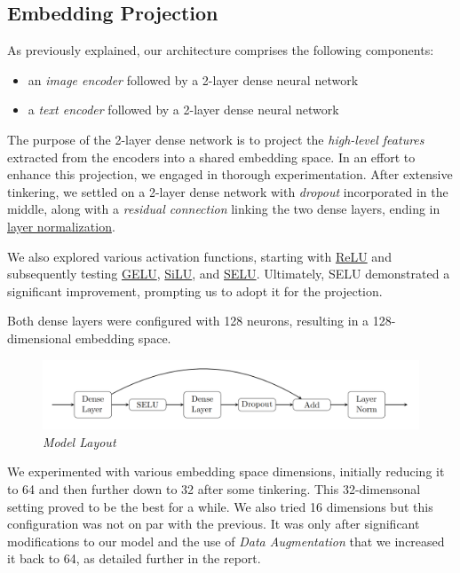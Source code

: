 \documentclass[10pt,twocolumn,letterpaper]{article}
\begin{document}
\subsection{Embedding Projection}
As previously explained, our architecture comprises the following components:
\begin{itemize}
   \item an \textit{image encoder} followed by a 2-layer dense neural network
   \item a \textit{text encoder} followed by a 2-layer dense neural network
\end{itemize}
The purpose of the 2-layer dense network is to project the \textit{high-level features} extracted from the encoders into a shared embedding space.
In an effort to enhance this projection, we engaged in thorough experimentation.
After extensive tinkering, we settled on a 2-layer dense network with \textit{dropout} incorporated in the middle, along with a \textit{residual connection} linking the two dense layers, ending in \href{https://keras.io/api/layers/normalization_layers/layer_normalization/}{layer normalization}.

We also explored various activation functions, starting with \href{https://keras.io/api/layers/activation_layers/relu/}{ReLU} and subsequently testing \href{https://www.tensorflow.org/api_docs/python/tf/keras/activations/gelu}{GELU}, \href{https://www.tensorflow.org/api_docs/python/tf/nn/silu}{SiLU}, and \href{https://www.tensorflow.org/api_docs/python/tf/nn/selu}{SELU}. Ultimately, SELU demonstrated a significant improvement, prompting us to adopt it for the projection.

Both dense layers were configured with 128 neurons, resulting in a 128-dimensional embedding space.

\begin{figure}[H]
   \centering
   \includegraphics[width=1\linewidth]{img/Tikz_Model.png}
   \caption{\textit{Model Layout}}
\end{figure}  

We experimented with various embedding space dimensions, initially reducing it to 64 and then further down to 32 after some tinkering. This 32-dimensonal setting proved to be the best for a while. We also tried 16 dimensions but this configuration was not on par with the previous. It was only after significant modifications to our model and the use of \textit{Data Augmentation} that we increased it back to 64, as detailed further in the report.
\end{document}
